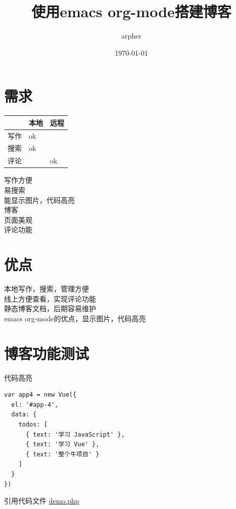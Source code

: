 \documentclass[11pt]{article}
\author{arpher}
\date{\today}
\title{使用emacs org-mode搭建博客}
\begin{document}
\maketitle
\tableofcontents


\section{需求}
\label{sec-1}

\begin{center}
\begin{tabular}{lll}
 & 本地 & 远程\\
\hline
写作 & ok & \\
搜索 & ok & \\
评论 &  & ok\\
\end{tabular}
\end{center}


写作方便 \\
  易搜索 \\
  能显示图片，代码高亮 \\
博客 \\
  页面美观 \\
  评论功能 \\
\section{优点}
\label{sec-2}
本地写作，搜索，管理方便 \\
线上方便查看，实现评论功能 \\
静态博客文档，后期容易维护 \\

emacs org-mode的优点，显示图片，代码高亮 \\
\section{博客功能测试}
\label{sec-3}
代码高亮 \\
\begin{verbatim}
var app4 = new Vue({
  el: '#app-4',
  data: {
	todos: [
	  { text: '学习 JavaScript' },
	  { text: '学习 Vue' },
	  { text: '整个牛项目' }
	]
  }
})
\end{verbatim}
引用代码文件 \url{demo.php} \\
\end{document}
